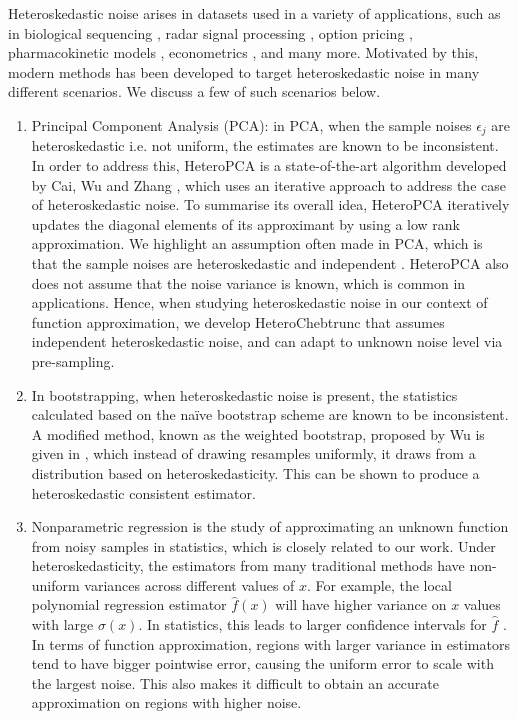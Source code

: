 \documentclass[pdflatex,sn-mathphys-num]{sn-jnl}%
\theoremstyle{thmstyleone}%
\theoremstyle{thmstyletwo}%
\theoremstyle{thmstylethree}%
\begin{document}
Heteroskedastic noise arises in datasets used in a variety of applications, such as in biological sequencing \cite{bio_seq}, radar signal processing \cite{radar}, option pricing \cite{finance}, pharmacokinetic models \cite{pharmacokinetic}, econometrics \cite{econometrics}, and many more. Motivated by this, modern methods has been developed to target heteroskedastic noise in many different scenarios. We discuss a few of such scenarios below.

\begin{enumerate}
	\item Principal Component Analysis (PCA): in PCA, when the sample noises $\epsilon_j$ are heteroskedastic i.e. not uniform, the estimates are known to be inconsistent. In order to address this, HeteroPCA is a state-of-the-art algorithm developed by Cai, Wu and Zhang \cite{PCA}, which uses an iterative approach to address the case of heteroskedastic noise. To summarise its overall idea, HeteroPCA iteratively updates the diagonal elements of its approximant by using a low rank approximation. We highlight an assumption often made in PCA, which is that the sample noises are heteroskedastic and independent \cite{PCA, deflated-PCA, missing-PCA}. HeteroPCA also does not assume that the noise variance is known, which is common in applications. Hence, when studying heteroskedastic noise in our context of function approximation, we develop HeteroChebtrunc that assumes independent heteroskedastic noise, and can adapt to unknown noise level via pre-sampling.
	\item In bootstrapping, when heteroskedastic noise is present, the statistics calculated based on the naïve bootstrap scheme are known to be inconsistent. A modified method, known as the weighted bootstrap, proposed by Wu is given in \cite{weighted_boots}, which instead of drawing resamples uniformly, it draws from a distribution based on heteroskedasticity. This can be shown to produce a heteroskedastic consistent estimator. 
	\item Nonparametric regression is the study of approximating an unknown function from noisy samples in statistics, which is closely related to our work. Under heteroskedasticity, the estimators from many traditional methods have non-uniform variances across different values of $x$. For example, the local polynomial regression estimator $\hat{f}(x)$ will have higher variance on $x$ values with large $\sigma(x)$. In statistics, this leads to larger confidence intervals for $\hat{f}$ \cite{wasserman}. In terms of function approximation, regions with larger variance in estimators tend to have bigger pointwise error, causing the uniform error to scale with the largest noise. This also makes it difficult to obtain an accurate approximation on regions with higher noise. 
	

\end{enumerate}
\end{document}
